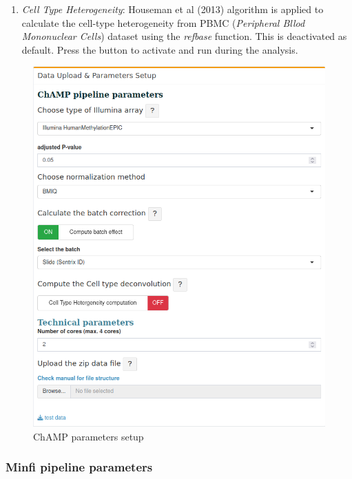 \documentclass[
  a4paper,
  oneside,
  open=any]{scrreport}
\providecommand{\tightlist}{%
  \setlength{\itemsep}{0pt}\setlength{\parskip}{0pt}}\usepackage{longtable,booktabs,array}
\begin{document}
\begin{enumerate}
\def\labelenumi{\arabic{enumi}.}
\setcounter{enumi}{4}
\tightlist
\item
  \emph{Cell Type Heterogeneity}: Houseman et al (2013)
  \autocite{houseman2012dna} algorithm is applied to calculate the
  cell-type heterogeneity from PBMC (\emph{Peripheral Bllod Mononuclear
  Cells}) dataset using the \emph{refbase} function. This is deactivated
  as default. Press the button to activate and run during the
  analysis.\\
\end{enumerate}

\begin{figure}[H]

{\centering \includegraphics{./_images/methylysis_02.png}

}

\caption{ChAMP parameters setup}

\end{figure}

\hypertarget{minfi-pipeline-parameters}{%
\subsubsection{\texorpdfstring{\textbf{Minfi pipeline
parameters}}{Minfi pipeline parameters}}\label{minfi-pipeline-parameters}}
\end{document}
